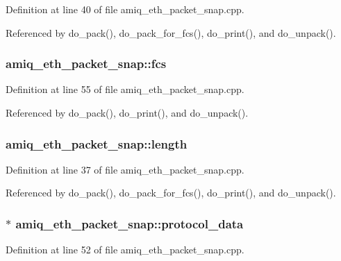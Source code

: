 Definition at line 40 of file amiq\_\-eth\_\-packet\_\-snap.cpp.

Referenced by do\_\-pack(), do\_\-pack\_\-for\_\-fcs(), do\_\-print(), and do\_\-unpack().\hypertarget{classamiq__eth__packet__snap_aca86c29ed386cc63461db470932b70bc}{
\subsubsection[{fcs}]{ {\bf amiq\_\-eth\_\-packet\_\-snap::fcs}}}
\label{classamiq__eth__packet__snap_aca86c29ed386cc63461db470932b70bc}


Definition at line 55 of file amiq\_\-eth\_\-packet\_\-snap.cpp.

Referenced by do\_\-pack(), do\_\-print(), and do\_\-unpack().\hypertarget{classamiq__eth__packet__snap_aab2892c994afa1c55c560ae287f96f19}{
\subsubsection[{length}]{ {\bf amiq\_\-eth\_\-packet\_\-snap::length}}}
\label{classamiq__eth__packet__snap_aab2892c994afa1c55c560ae287f96f19}


Definition at line 37 of file amiq\_\-eth\_\-packet\_\-snap.cpp.

Referenced by do\_\-pack(), do\_\-pack\_\-for\_\-fcs(), do\_\-print(), and do\_\-unpack().\hypertarget{classamiq__eth__packet__snap_aef5354d102ccd32cc521388767ca23fe}{
\subsubsection[{protocol\_\-data}]{$\ast$ {\bf amiq\_\-eth\_\-packet\_\-snap::protocol\_\-data}}}
\label{classamiq__eth__packet__snap_aef5354d102ccd32cc521388767ca23fe}


Definition at line 52 of file amiq\_\-eth\_\-packet\_\-snap.cpp.

